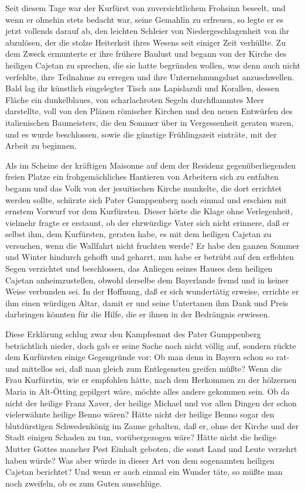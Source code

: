 Seit diesem Tage war der Kurfürst von zuversichtlichem Frohsinn
beseelt, und wenn er ohnehin stets bedacht war,\pagenum{[120]}
seine Gemahlin zu erfreuen, so legte er es jetzt vollends darauf
ab, den leichten Schleier von Niedergeschlagenheit von ihr
abzulösen, der die stolze Heiterkeit ihres Wesens seit einiger Zeit
verhüllte. Zu dem Zweck ermunterte er ihre frühere Baulust und
begann von der Kirche des heiligen Cajetan zu sprechen, die sie
hatte begründen wollen, was denn auch nicht verfehlte, ihre
Teilnahme zu erregen und ihre Unternehmungslust anzuschwellen. Bald
lag ihr künstlich eingelegter Tisch aus Lapislazuli und Korallen,
dessen Fläche ein dunkelblaues, von scharlachroten Segeln
durchflammtes Meer darstellte, voll von den Plänen römischer
Kirchen und den neuen Entwürfen des italienischen Baumeisters, die
den Sommer über in Vergessenheit geraten waren, und es wurde
beschlossen, sowie die günstige Frühlingszeit einträte, mit der
Arbeit zu beginnen.

Als im Scheine der kräftigen Maisonne auf dem der Residenz
gegenüberliegenden freien Platze ein frohgemächliches Hantieren von
Arbeitern sich zu entfalten begann und das Volk von der
jesuitischen Kirche munkelte, die dort errichtet werden sollte,
schürzte sich Pater Gumppenberg noch einmal und erschien mit
ernstem Vorwurf vor dem Kurfürsten. Dieser hörte die Klage ohne
Verlegenheit, vielmehr fragte er erstaunt, ob der ehrwürdige Vater
sich nicht erinnere, daß er selbst ihm, dem Kurfürsten, geraten
habe, es mit dem heiligen Cajetan zu versuchen, wenn die Wallfahrt
nicht fruchten werde? Er habe den ganzen Sommer und Winter hindurch
gehofft und geharrt, nun habe er betrübt auf den erflehten Segen
verzichtet und beschlossen, das Anliegen seines Hauses dem heiligen
Cajetan anheimzustellen, obwohl derselbe dem Bayerlande fremd und
in keiner Weise verbunden sei. In der Hoffnung, daß er sich
\pagenum{[121]}wundertätig erweise, errichte er ihm einen würdigen
Altar, damit er und seine Untertanen ihm Dank und Preis darbringen
könnten für die Hilfe, die er ihnen in der Bedrängnis erwiesen.

Diese Erklärung schlug zwar den Kampfesmut des Pater Gumppenberg
beträchtlich nieder, doch gab er seine Sache noch nicht völlig auf,
sondern rückte dem Kurfürsten einige Gegengründe vor: Ob man denn
in Bayern schon so rat- und mittellos sei, daß man gleich zum
Entlegensten greifen müßte? Wenn die Frau Kurfürstin, wie er
empfohlen hätte, nach dem Herkommen zu der hölzernen Maria in
Alt-Ötting gepilgert wäre, möchte alles andere gekommen sein. Ob da
nicht der heilige Franz Xaver, der heilige Michael und vor allen
Dingen der schon vielerwähnte heilige Benno wären? Hätte nicht der
heilige Benno sogar den blutdürstigen Schwedenkönig im Zaune
gehalten, daß er, ohne der Kirche und der Stadt einigen Schaden zu
tun, vorübergezogen wäre? Hätte nicht die heilige Mutter Gottes
mancher Pest Einhalt geboten, die sonst Land und Leute verzehrt
haben würde? Was aber würde in dieser Art von dem sogenannten
heiligen Cajetan berichtet? Und wenn er auch einmal ein Wunder
täte, so müßte man noch zweifeln, ob es zum Guten ausschlüge.

